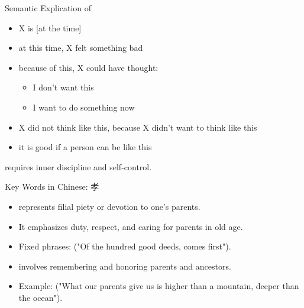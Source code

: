 \documentclass{beamer}
\newcommand{\ind}{\mtciteform}
\begin{document}
\begin{frame}{Semantic Explication of }
  \begin{itemize}
  \item X is \ind{sabar} [at the time]
  \item at this time, X felt something bad
  \item because of this, X could have thought:
    \begin{itemize}
    \item  I don't want this
    \item I want to do something now
    \end{itemize}
  \item X did not think like this, because X didn't want to think like this
  \item it is good if a person can be like this
        \end{itemize}
\bigskip
          requires inner discipline and self-control.
\end{frame}

\begin{frame}{Key Words in Chinese: 孝 }
    \begin{itemize}
        \item {} represents filial piety or devotion to one's parents.
        \item It emphasizes duty, respect, and caring for parents in old age.
        \item Fixed phrases:  ("Of the hundred good deeds,  comes first").
        \item {} involves remembering and honoring parents and ancestors.
        \item Example:  ("What our parents give us is higher than a mountain, deeper than the ocean").
    \end{itemize}
\end{frame}
\end{document}
